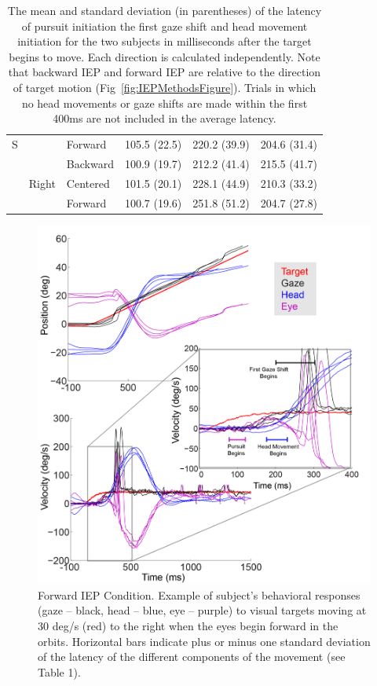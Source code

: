 \documentclass[12pt]{article}
\begin{document}
\begin{table}[h]
\begin{tabular}{@{}lllccc@{}}
\multicolumn{1}{c}{S} & \cellcolor[HTML]{EFEFEF}     & \cellcolor[HTML]{EFEFEF}Forward  & \cellcolor[HTML]{EFEFEF}105.5 (22.5) & \cellcolor[HTML]{EFEFEF}220.2 (39.9) & \cellcolor[HTML]{EFEFEF}204.6 (31.4) \\
                      &                              & Backward                         & 100.9 (19.7)                         & 212.2 (41.4)                         & 215.5 (41.7)                         \\
                      & Right                        & Centered                         & 101.5 (20.1)                         & 228.1 (44.9)                         & 210.3 (33.2)                         \\
                      &                              & Forward                          & 100.7 (19.6)                         & 251.8 (51.2)                         & 204.7 (27.8)                         \\ \bottomrule
\end{tabular}
\caption[Latency]{The mean and standard deviation (in parentheses) of the latency of pursuit initiation the first gaze shift and head movement initiation for the two subjects in milliseconds after the target begins to move. Each direction is calculated independently. Note that backward IEP and forward IEP are relative to the direction of target motion (Fig~\ref{fig:IEPMethodsFigure}).  Trials in which no head movements or gaze shifts are made within the first 400ms are not included in the average latency.}
\label{tab:Ramp}
\end{table}

\begin{figure}[h]
\centering
\includegraphics[width=0.7\linewidth]{./figs/ForwardIEP}
\caption[Behavior during Forward IEP]{Forward IEP Condition. Example of subject's behavioral responses (gaze – black, head – blue, eye – purple) to visual targets moving at 30 deg/s (red) to the right when the eyes begin forward in the orbits. Horizontal bars indicate plus or minus one standard deviation of the latency of the different components of the movement (see Table 1).
}
\label{fig:ForwardIEP}
\end{figure}
\end{document}
